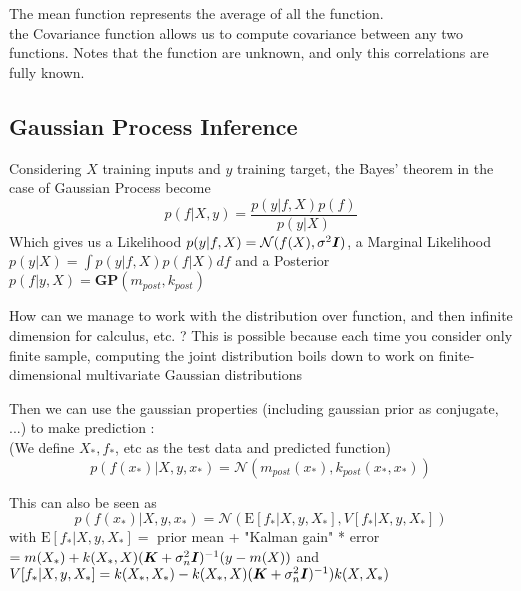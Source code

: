 				The mean function represents the average of all the function.\\
				the Covariance function allows us to compute covariance between any two functions. Notes that the function are unknown, and only this correlations are fully known.

			\subsection{Gaussian Process Inference} %
			\label{sub:gaussian_process_inference}
				
				Considering $X$ training inputs and $y$ training target, the Bayes' theorem in the case of Gaussian Process become 
				\[
					p(f | X, y) = \frac{p(y | f, X)p(f)}{p(y | X)}
				\]
				Which gives us a Likelihood $p(y | f, X) = \mathcal{N}(f(X), \sigma^2 {\boldsymbol{{I}}})$, a Marginal Likelihood $p(y | X) = \int p(y | f, X) p (f | X) df$ and a Posterior $p(f |y, X) = \textbf{GP}(m_{post}, k_{post})$

				How can we manage to work with the distribution over function, and then infinite dimension for calculus, etc. ? This is possible because each time you consider only finite sample, computing the joint distribution boils down to work on finite-dimensional multivariate Gaussian distributions

				Then we can use the gaussian properties (including gaussian prior as conjugate, ...) to make prediction : \\
				(We define $X_*, f_*$, etc as the test data and predicted function)
				\[
					p(f(x_*) | X, y, x_*) = \mathcal{N}(m_{post}(x_*), k_{post}(x_*, x_*))
				\]

				This can also be seen as 
				\[
					p(f(x_*) | X, y, x_*) = \mathcal{N}(\text{E}{[f_* | X, y, X_*]}, V{[f_* | X, y, X_*]})
				\]
				with $\text{E}[f_* | X, y, X_*] =$ prior mean + "Kalman gain" * error $= m(X_*) + k(X_*, X)({\boldsymbol{{K}}} + \sigma^2_n {\boldsymbol{{I}}})^{-1}(y-m(X))$ and $V [f_* | X, y, X_*] = k(X_*, X_*) - k(X_*, X)({\boldsymbol{{K}}} + \sigma^2_n {\boldsymbol{{I}}})^{-1})k(X, X_*)$



